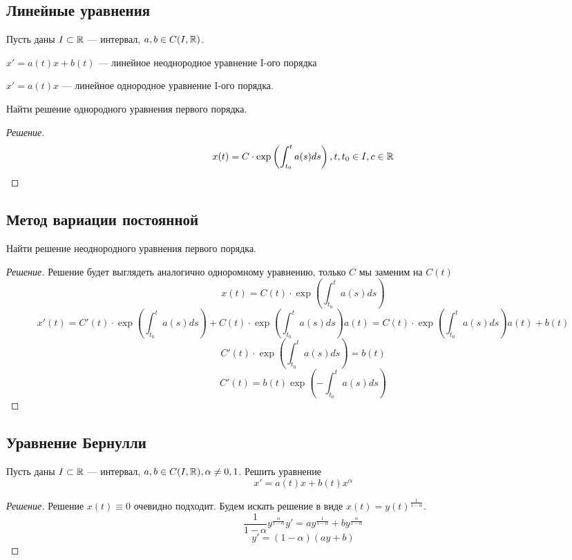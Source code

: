 \subsection{Линейные уравнения}
Пусть даны \(I \subset \mathbb{R}\) --- интервал, \(a, b \in C(I, \mathbb{R})\).
\begin{definition}
    \(x' = a(t)x + b(t)\) --- линейное неоднородное уравнение I-ого порядка
\end{definition}
\begin{definition}
    \(x' = a(t)x\) --- линейное однородное уравнение I-ого порядка. 
\end{definition}

\begin{problem}
    Найти решение однородного уравнения первого порядка.
\end{problem}
\begin{proof}[Решение]
    \[x(t) = C \cdot \exp\left(\int_{t_0}^t a(s)ds\right), t, t_0 \in I, c \in \mathbb{R}\]
\end{proof}

\subsection{Метод вариации постоянной}
\begin{problem}
    Найти решение неоднородного уравнения первого порядка.
\end{problem}
\begin{proof}[Решение]
    Решение будет выглядеть аналогично одноромному уравнению, только \(C\) мы заменим на \(C(t)\)
    \[x(t) = C(t) \cdot \exp\left(\int_{t_0}^t a(s)ds\right)\]
    \[x'(t) = C'(t) \cdot \exp\left(\int_{t_0}^t a(s)ds\right) + C(t) \cdot \exp\left(\int_{t_0}^t a(s)ds\right)a(t) = C(t) \cdot \exp\left(\int_{t_0}^t a(s)ds\right)a(t) + b(t)\]
    \[C'(t) \cdot \exp\left(\int_{t_0}^t a(s)ds\right) = b(t)\]
    \[C'(t) = b(t)\exp\left(-\int_{t_0}^t a(s)ds\right)\]
\end{proof}

\subsection{Уравнение Бернулли}
\begin{problem}
    Пусть даны \(I \subset \mathbb{R}\) --- интервал, \(a, b \in C(I, \mathbb{R}), \alpha \ne 0, 1\). Решить уравнение
    \[x' = a(t)x + b(t)x^\alpha\]
\end{problem}
\begin{proof}[Решение]
    Решение \(x(t) \equiv 0\) очевидно подходит. Будем искать решение в виде \(x(t) = y(t)^{\frac{1}{1 - \alpha}}\).
    \[\frac{1}{1 - \alpha}y^{\frac{\alpha}{1 - \alpha}}y' = ay^{\frac{1}{1 - \alpha}} + by^{\frac{\alpha}{1 - \alpha}}\]
    \[y' = (1 - \alpha)(ay + b)\]
\end{proof}

